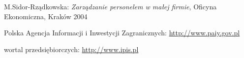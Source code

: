 \begin{thebibliography}{99}
M.Sidor-Rządkowska: \emph{Zarządzanie personelem w małej firmie}, Oficyna Ekonomiczna, Kraków 2004

Polska Agencja Informacji i Inwestycji Zagranicznych: \url{http://www.paiy.gov.pl}

wortal przedsiębiorczych: \url{http://www.ipis.pl}

\end{thebibliography}
